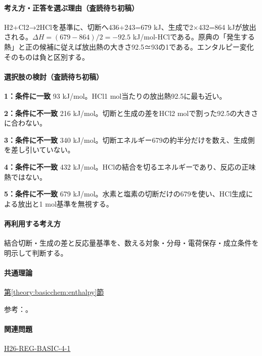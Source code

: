 \paragraph{考え方・正答を選ぶ理由（査読待ち初稿）} H2+Cl2→2HClを基準に、切断へ436+243=\allowbreak{}679 kJ、生成で2×432=\allowbreak{}864 kJが放出される。\(\Delta H=(679-864)/2=-92.5\) kJ/mol-HClである。原典の「発生する熱」と正の候補に従えば放出熱の大きさ92.5≃93の1である。エンタルピー変化そのものは負と区別する。

\paragraph{選択肢の検討（査読待ち初稿）}\mbox{}\par

\noindent\textbf{1：条件に一致} 93 kJ/mol。HCl1 mol当たりの放出熱92.5に最も近い。\par

\noindent\textbf{2：条件に不一致} 216 kJ/mol。切断と生成の差をHCl2 molで割った92.5の大きさに合わない。\par

\noindent\textbf{3：条件に不一致} 340 kJ/mol。切断エネルギー679の約半分だけを数え、生成側を差し引いていない。\par

\noindent\textbf{4：条件に不一致} 432 kJ/mol。HClの結合を切るエネルギーであり、反応の正味熱ではない。\par

\noindent\textbf{5：条件に不一致} 679 kJ/mol。水素と塩素の切断だけの679を使い、HCl生成による放出と1 mol基準を無視する。\par

\paragraph{再利用する考え方} 結合切断・生成の差と反応量基準を、数える対象・分母・電荷保存・成立条件を明示して判断する。

\paragraph{共通理論} \hyperref[theory:basicchem:enthalpy]{第\ref*{theory:basicchem:enthalpy}節}

\par 参考：\cite{mit_bond_enthalpy}。

\paragraph{関連問題} \hyperref[q:h26-reg-basic-4-1]{H26-REG-BASIC-4-1}

